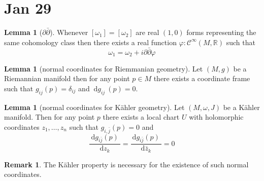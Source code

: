 \documentclass[12pt]{extarticle}
\newcommand{\R}{\mathbb{R}}
\renewcommand{\d}[1]{\: \mathrm{d}#1 \:}
\newcommand{\deriv}[2]{\frac{\d{#1}}{\d{#2}}}
\theoremstyle{definition}
\newtheorem{lemma}[theorem]{Lemma}
\newtheorem{remark}{Remark}
\newcommand{\Class}[2]{\mathcal{C}^{#1} \left( #2 \right)}
\begin{document}
\section{Jan 29}

\begin{lemma}[$\partial \bar{\partial}$]
Whenever $[\omega_1] = [\omega_2]$ are real $(1,0)$ forms representing the same cohomology class then there exists a real function $\varphi : \Class{\infty}{M, \R}$ such that \[ \omega_1 = \omega_2 + i \partial \bar{\partial} \varphi \]
\end{lemma}

\begin{lemma}[normal coordinates for Riemmanian geometry]
Let $(M, g)$ be a Riemannian manifold then for any point $p \in M$ there exists a coordinate frame such that $g_{ij}(p) = \delta_{ij}$ and $\d{g_{ij}}(p) = 0$. 
\end{lemma}

\begin{lemma}[normal coordinates for K\"{a}hler geometry]
Let $(M, \omega, J)$ be a K\"{a}hler manifold. Then for any point $p$ there exists a local chart $U$ with holomorphic coordinates $z_1, \dots, z_n$ such that $g_{i, \bar{j}}(p) = 0$ and 
\[ \deriv{g_{i \bar{j}}(p)}{z_k} = \deriv{g_{i\bar{j}}(p)}{\bar{z}_k} = 0 \]
\end{lemma}

\begin{remark}
The K\"{a}hler property is necessary for the existence of such normal coordinates.
\end{remark}
\end{document}
